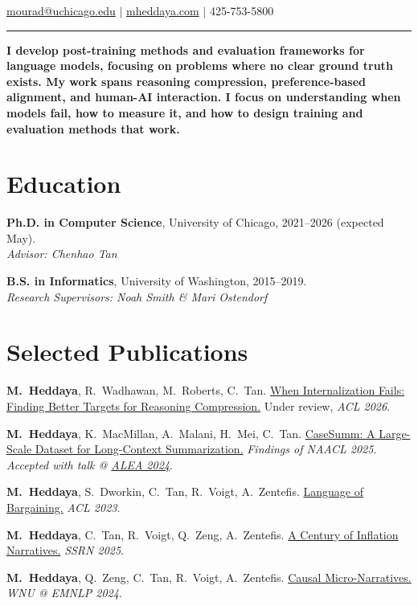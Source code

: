 \documentclass[11pt,letterpaper]{article}
\begin{document}
\hfill{\normalsize \href{mailto:mourad@uchicago.edu}{mourad@uchicago.edu} $|$ \href{https://mheddaya.com}{mheddaya.com} $|$ 425-753-5800}
\vspace{2pt}
\hrule

\vspace{12pt}
\noindent \textbf{I develop post-training methods and evaluation frameworks for language models, focusing on problems where no clear ground truth exists. My work spans reasoning compression, preference-based alignment, and human-AI interaction. I focus on understanding when models fail, how to measure it, and how to design training and evaluation methods that work.}

\section*{Education}

\textbf{Ph.D. in Computer Science}, University of Chicago, 2021--2026 (expected May).\\
\hspace*{2em}\textit{Advisor: Chenhao Tan}

\vspace{4pt}

\textbf{B.S. in Informatics}, University of Washington, 2015--2019.\\
\hspace*{2em}\textit{Research Supervisors: Noah Smith \& Mari Ostendorf}

\section*{Selected Publications}
\vspace{4pt}
\begin{enumerate}[label={[\arabic*]}, leftmargin=2em, topsep=2pt, itemsep=1pt, parsep=0pt]
    \item \textbf{M.\ Heddaya}, R.\ Wadhawan, M.\ Roberts, C.\ Tan. \href{https://mheddaya.com/papers/acl2026_abridge.pdf}{When Internalization Fails: Finding Better Targets for Reasoning Compression.} Under review, \textit{ACL 2026}.
    \item \textbf{M.\ Heddaya}, K.\ MacMillan, A.\ Malani, H.\ Mei, C.\ Tan. \href{https://arxiv.org/abs/2501.00097}{CaseSumm: A Large-Scale Dataset for Long-Context Summarization.} \textit{Findings of NAACL 2025}. \textit{Accepted with talk @ \href{https://alea2024.github.io/}{ALEA 2024}}.
    \item \textbf{M.\ Heddaya}, S.\ Dworkin, C.\ Tan, R.\ Voigt, A.\ Zentefis. \href{https://aclanthology.org/2023.acl-long.735/}{Language of Bargaining.} \textit{ACL 2023}.
    \item \textbf{M.\ Heddaya}, C.\ Tan, R.\ Voigt, Q.\ Zeng, A.\ Zentefis. \href{https://papers.ssrn.com/sol3/papers.cfm?abstract_id=5259107}{A Century of Inflation Narratives.} \textit{SSRN 2025}.
    \item \textbf{M.\ Heddaya}, Q.\ Zeng, C.\ Tan, R.\ Voigt, A.\ Zentefis. \href{https://aclanthology.org/2024.wnu-1.12/}{Causal Micro-Narratives.} \textit{WNU @ EMNLP 2024}.
\end{enumerate}
\end{document}

